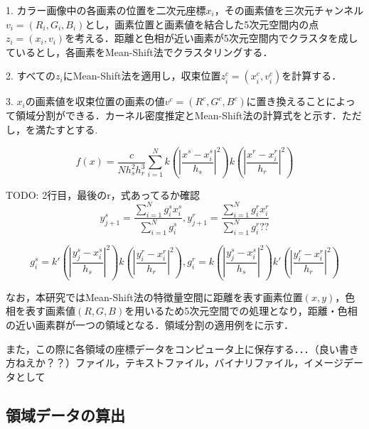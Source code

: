      1. カラー画像中の各画素の位置を二次元座標$x_i$，その画素値を三次元チャンネル$v_{i} =(R_{i},G_{i},B_{i})$とし，画素位置と画素値を結合した5次元空間内の点$z_{i} = (x_{i}, v_{i})$を考える．距離と色相が近い画素が5次元空間内でクラスタを成しているとし，各画素をMean-Shift法でクラスタリングする．

      2. すべての$z_{i}$にMean-Shift法を適用し，収束位置$z_{i}^c = (x_{i}^c , v_{i}^c)$を計算する．
      
      3. $x_{i}$の画素値を収束位置の画素の値$v^c = (R^c, G^c, B^c)$に置き換えることによって領域分割ができる．カーネル密度推定とMean-Shift法の計算式をと示す．ただし，を満たすとする.
    
      \begin{equation}
        \label{Mean-Shift法1}
        f(x) = \dfrac{c} {N h_{s}^2 h_{r}^3}
          \sum_{i=1}^{N}
          k (|\dfrac{x^s - x_{i}^s} {h_{s}}|^2) k (|\dfrac{x^r - x_{i}^r} {h_{r}}|^2)
      \end{equation}

      TODO: 2行目，最後のr，式あってるか確認
      \begin{equation}
        \label{Mean-Shift法2}
        y_{j+1}^s = 
          \dfrac{\sum_{i=1}^{N} g_{i}^s x_{i}^s} {\sum_{i=1}^{N} g_{i}^s}, 
        y_{j+1}^r = 
          \dfrac{\sum_{i=1}^{N} g_{i}^r x_{i}^r} {\sum_{i=1}^{N} g_{i}^r??}
      \end{equation}

      \begin{equation}
        \label{Mean-Shift法3}
        g_{i}^s = k' (|\dfrac{y_{j}^s - x_{i}^s} {h_{s}}|^2)
                  k  (|\dfrac{y_{i}^r - x_{i}^r} {h_{r}}|^2), 
        g_{i}^r = k  (|\dfrac{y_{j}^s - x_{i}^s} {h_{s}}|^2) 
                  k' (|\dfrac{y_{i}^r - x_{i}^r} {h_{r}}|^2)
      \end{equation}

      なお，本研究ではMean-Shift法の特徴量空間に距離を表す画素位置$(x,y)$，色相を表す画素値$(R,G,B)$を用いるため5次元空間での処理となり，距離・色相の近い画素群が一つの領域となる．領域分割の適用例を\fref{}に示す．

      また，この際に各領域の座標データをコンピュータ上に保存する．．．（良い書き方ねえか？？）ファイル，テキストファイル，バイナリファイル，イメージデータとして

    \subsection{領域データの算出}
